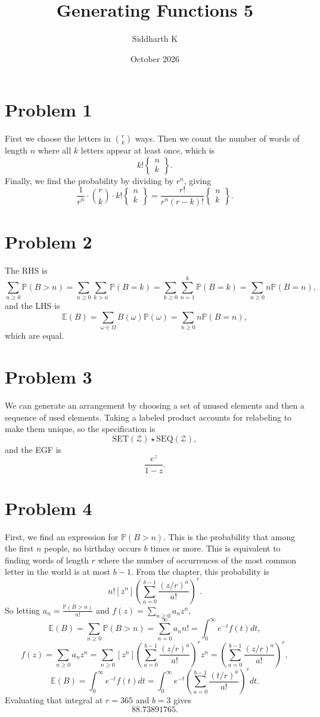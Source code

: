 \documentclass{article}
\title{Generating Functions 5}
\author{Siddharth K}
\date{October 2026}
\newcommand{\mcZ}{\mathcal{Z}}
\newcommand{\E}{\mathbb{E}}
\renewcommand{\P}{\mathbb{P}}
\newcommand{\seq}{\mathrm{SEQ}}
\newcommand{\set}{\mathrm{SET}}
\newcommand{\bigp}[1]{\left(#1\right)}
\begin{document}
\maketitle

\section*{Problem 1}
First we choose the letters in $\binom{r}{k}$ ways. Then we count the number of words of length $n$ where all $k$ letters appear at least once, which is
\[
    k! \begin{Bmatrix} n \\ k \end{Bmatrix}.
\]
Finally, we find the probability by dividing by $r^n$, giving
\[
    \frac{1}{r^n} \cdot \binom{r}{k} \cdot k! \begin{Bmatrix} n \\ k \end{Bmatrix} = \frac{r!}{r^n (r - k)!} \begin{Bmatrix} n \\ k \end{Bmatrix}.
\]

\section*{Problem 2}
The RHS is
\[
    \sum_{n \ge 0} \P(B > n) = \sum_{n \ge 0} \sum_{k > n} \P(B = k) = \sum_{k \ge 0} \sum_{n = 1}^k \P(B = k) = \sum_{n \ge 0} n \P(B = n),
\]
and the LHS is
\[
    \E(B) = \sum_{\omega \in \Omega} B(\omega) \P(\omega) = \sum_{n \ge 0} n \P(B = n),
\]
which are equal.

\section*{Problem 3}
We can generate an arrangement by choosing a set of unused elements and then a sequence of used elements. Taking a labeled product accounts for relabeling to make them unique, so the specification is
\[
    \set(\mcZ) \star \seq(\mcZ),
\]
and the EGF is
\[
    \frac{e^z}{1 - z}.
\]

\section*{Problem 4}
First, we find an expression for $\P(B > n)$. This is the probability that among the first $n$ people, no birthday occurs $b$ times or more. This is equivalent to finding words of length $r$ where the number of occurrences of the most common letter in the world is at most $b - 1$. From the chapter, this probability is
\[
    n![z^n]\bigp{\sum_{a = 0}^{b - 1} \frac{(z/r)^a}{a!}}^r.
\]
So letting $a_n = \frac{\P(B > n)}{n!}$ and $f(z) = \sum_{n \ge 0} a_n z^n$,
\[
    \E(B) = \sum_{n \ge 0} \P(B > n) = \sum_{n = 0}^\infty a_n n! = \int_0^\infty e^{-t} f(t) dt,
\]
\[
    f(z) = \sum_{n \ge 0} a_n z^n = \sum_{n \ge 0} [z^n] \bigp{\sum_{a = 0}^{b - 1} \frac{(z/r)^a}{a!}}^r z^n = \bigp{\sum_{a = 0}^{b - 1} \frac{(z/r)^a}{a!}}^r,
\]
\[
    \E(B) = \int_0^\infty e^{-t} f(t) dt = \int_0^\infty e^{-t} \bigp{\sum_{a = 0}^{b - 1} \frac{(t/r)^a}{a!}}^r dt.
\]
Evaluating that integral at $r = 365$ and $b = 3$ gives
\[
    88.73891765.
\]
\end{document}
